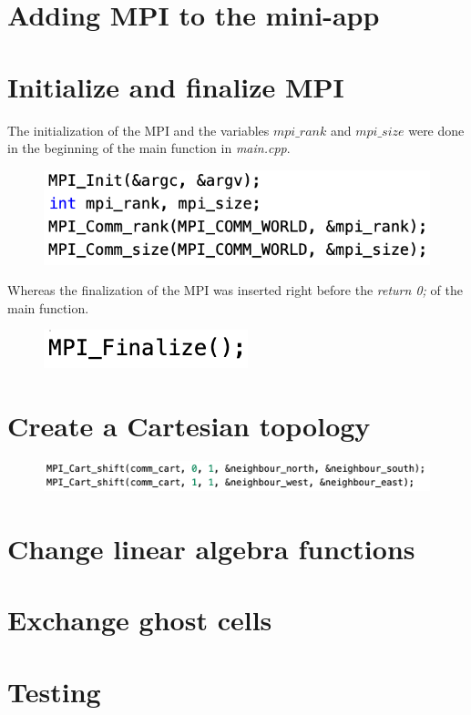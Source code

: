 \documentclass[unicode,11pt,a4paper,oneside,numbers=endperiod,openany]{scrartcl}
\begin{document}
\graphicspath{{./img/}}

\setassignment
{}

\newline

\section*{Adding MPI to the mini-app}

\section{Initialize and finalize MPI }

The initialization of the MPI and the variables $mpi\_rank$ and $mpi\_size$ were done in the beginning of the main function in \textit{main.cpp}.

\begin{figure}[H]
    \centering
    \includegraphics[width=.5\linewidth]{initialize}
\end{figure}

Whereas the finalization of the MPI was inserted right before the \textit{return 0;} of the main function.

\begin{figure}[H]
    \centering
    \includegraphics[width=.3\linewidth]{finalize}
\end{figure}

\section{Create a Cartesian topology }

\begin{figure}[H]
    \centering
    \includegraphics[width=\linewidth]{neighbours}
\end{figure}


\section{Change linear algebra functions }

\section{Exchange ghost cells }

\section{Testing }
\end{document}
